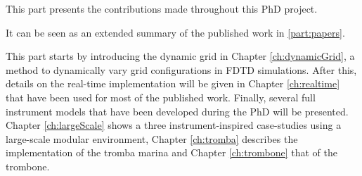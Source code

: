 This part presents the contributions made throughout this PhD project.

It can be seen as an extended summary of the published work in \ref{part:papers}.

This part starts by introducing the dynamic grid in Chapter \ref{ch:dynamicGrid}, a method to dynamically vary grid configurations in FDTD simulations. After this, details on the real-time implementation will be given in Chapter \ref{ch:realtime} that have been used for most of the published work. 
Finally, several full instrument models that have been developed during the PhD will be presented. Chapter \ref{ch:largeScale} shows a three instrument-inspired case-studies using a large-scale modular environment, Chapter \ref{ch:tromba} describes the implementation of the tromba marina and Chapter \ref{ch:trombone} that of the trombone.